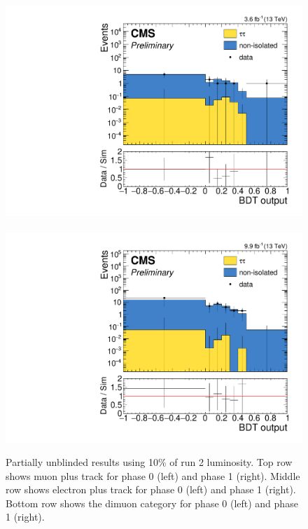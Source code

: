 \begin{figure}[!htb]
\includegraphics[width=0.48\linewidth]{plots/partial_unblinded_dimuon/sos_final_dilepBDTphase1CorrJetNoMultIso10Dr0.6_log.pdf} \,
\includegraphics[width=0.48\linewidth]{plots/partial_unblinded_dimuon_phase1/sos_final_dilepBDTCorrJetNoMultIso10Dr0.6_log.pdf} \\

\caption[Partially unblinded results]{Partially unblinded results using 10\% of run 2 luminosity. Top row shows muon plus track for phase 0 (left) and phase 1 (right). Middle row shows electron plus track for phase 0 (left) and phase 1 (right). Bottom row shows the dimuon category for phase 0 (left) and phase 1 (right).}
\label{fig:unblinded_results}
\end{figure}

